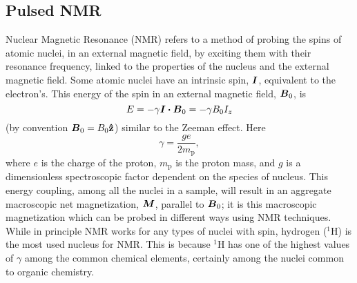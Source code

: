 \documentclass[11pt,a4paper, twocolumn,
swedish, english %
]{article}
\begin{document}

\subsection{Pulsed NMR}

Nuclear Magnetic Resonance (NMR) refers to a method of probing the
spins of atomic nuclei, in an external magnetic field, by exciting
them with their resonance frequency, linked to the properties of the
nucleus and the external magnetic field. Some atomic nuclei have an
intrinsic spin, $\vb*I$, equivalent to the electron's. This energy of
the spin in an external magnetic field, $\vb*B_0$, is
\begin{equation}\label{eq:mag-energy}
E=-\gamma\vb*I\vdot\vb*B_0=-\gamma B_0 I_z
\end{equation}
(by convention $\vb*B_0=B_0\vu{z}$) similar to the Zeeman effect. Here
\begin{equation}
\gamma=\frac{ge}{2m_\text{p}},
\end{equation}
where $e$ is the charge of the proton, $m_\text{p}$ is the proton
mass, and $g$ is a dimensionless spectroscopic factor dependent on the
species of nucleus. This energy coupling, among all the nuclei in a
sample, will result in an aggregate macroscopic net magnetization,
$\vb*M$, parallel to $\vb*B_0$; it is this macroscopic magnetization which
can be probed in different ways using NMR techniques. 
While in principle NMR works for any types of nuclei with spin,
hydrogen ($^1\!$H) is the most used nucleus for NMR. This is because
$^1\!$H has one of the highest values of $\gamma$ among the common
chemical elements, certainly among the nuclei common to organic
chemistry. 
\end{document}

